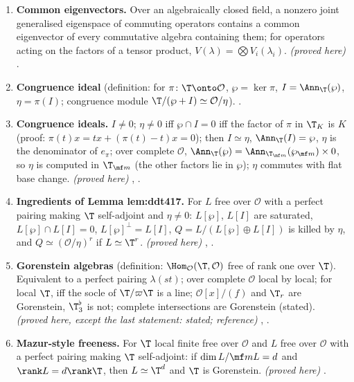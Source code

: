 \begin{enumerate}[label=\textbf{\thechapter.\arabic*}]
\item \textbf{Common eigenvectors.} Over an algebraically closed field, a nonzero joint generalised eigenspace of commuting operators contains a common eigenvector of
every commutative algebra containing them; for operators acting on the factors of a tensor product, $V(\lambda)=\bigotimes V_i(\lambda_i)$. \emph{(proved here)}
.
\item \textbf{Congruence ideal} (definition: for $\pi\colon\T\onto\mathcal O$, $\wp=\ker\pi$, $I=\Ann_\T(\wp)$, $\eta=\pi(I)$; congruence module $\T/(\wp+I)\simeq\mathcal O/\eta$).
.
\item \textbf{Congruence ideals.} $I\ne0$; $\eta\ne0$ iff $\wp\cap I=0$ iff the factor of $\pi$ in $\T_K$ is $K$ (proof: $\pi(t)x=tx+(\pi(t)-t)x=0$); then
$I\simeq\eta$, $\Ann_\T(I)=\wp$, $\eta$ is the denominator of $e_\pi$; over complete $\mathcal O$, $\Ann_\T(\wp)=\Ann_{\T_{\mf m}}(\wp_{\mf m})\times0$, so $\eta$ is computed in $\T_{\mf m}$ (the other
factors lie in $\wp$); $\eta$ commutes with flat base change. \emph{(proved here)} , .
\item \textbf{Ingredients of Lemma lem:ddt417.} For $L$ free over $\mathcal O$ with a perfect pairing making $\T$ self-adjoint and $\eta\ne0$: $L[\wp]$, $L[I]$ are saturated, $L[\wp]\cap L[I]=0$,
$L[\wp]^\perp=L[I]$, $Q=L/(L[\wp]\oplus L[I])$ is killed by $\eta$, and $Q\simeq(\mathcal O/\eta)^r$ if $L\simeq\T^r$. \emph{(proved here)} ,
.
\item \textbf{Gorenstein algebras} (definition: $\Hom_{\mathcal O}(\T,\mathcal O)$ free of rank one over $\T$). Equivalent to a perfect pairing $\lambda(st)$; over complete $\mathcal O$ local by local; for
local $\T$, iff the socle of $\T/\varpi\T$ is a line; $\mathcal O[x]/(f)$ and $\T_r$ are Gorenstein, $\T^\flat_3$ is not; complete intersections are Gorenstein (stated). \emph{(proved here,
except the last statement: stated; reference)} , .
\item \textbf{Mazur-style freeness.} For $\T$ local finite free over $\mathcal O$ and $L$ free over $\mathcal O$ with a perfect pairing making $\T$ self-adjoint: if $\dim L/\mf mL=d$ and
$\rank L=d\rank\T$, then $L\simeq\T^d$ and $\T$ is Gorenstein. \emph{(proved here)} .
\end{enumerate}

